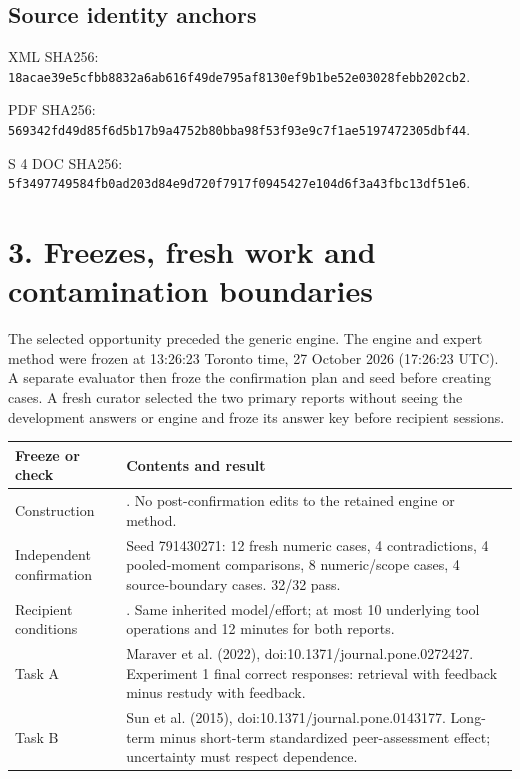 \documentclass[10pt]{article}
\begin{document}
\subsection*{Source identity anchors}

\footnotesize
XML SHA256: \nolinkurl{18acae39e5cfbb8832a6ab616f49de795af8130ef9b1be52e03028febb202cb2}.

PDF SHA256: \nolinkurl{569342fd49d85f6d5b17b9a4752b80bba98f53f93e9c7f1ae5197472305dbf44}.

S 4 DOC SHA256: \nolinkurl{5f3497749584fb0ad203d84e9d720f7917f0945427e104d6f3a43fbc13df51e6}.
\normalsize

\clearpage
\section*{3. Freezes, fresh work and contamination boundaries}

The selected opportunity preceded the generic engine. The engine and expert method were frozen at 13:26:23 Toronto time, 27 October 2026 (17:26:23 UTC). A separate evaluator then froze the confirmation plan and seed before creating cases. A fresh curator selected the two primary reports without seeing the development answers or engine and froze its answer key before recipient sessions.

\begin{tabularx}{\textwidth}{p{}Y}
\toprule Freeze or check & Contents and result\\\midrule
Construction & . No post-confirmation edits to the retained engine or method.\\
Independent confirmation & Seed 791430271: 12 fresh numeric cases, 4 contradictions, 4 pooled-moment comparisons, 8 numeric/scope cases, 4 source-boundary cases. 32/32 pass.\\
Recipient conditions & . Same inherited model/effort; at most 10 underlying tool operations and 12 minutes for both reports.\\
Task A & Maraver et al. (2022), doi:10.1371/journal.pone.0272427. Experiment 1 final correct responses: retrieval with feedback minus restudy with feedback.\\
Task B & Sun et al. (2015), doi:10.1371/journal.pone.0143177. Long-term minus short-term standardized peer-assessment effect; uncertainty must respect dependence.\\\bottomrule
\end{tabularx}
\end{document}
